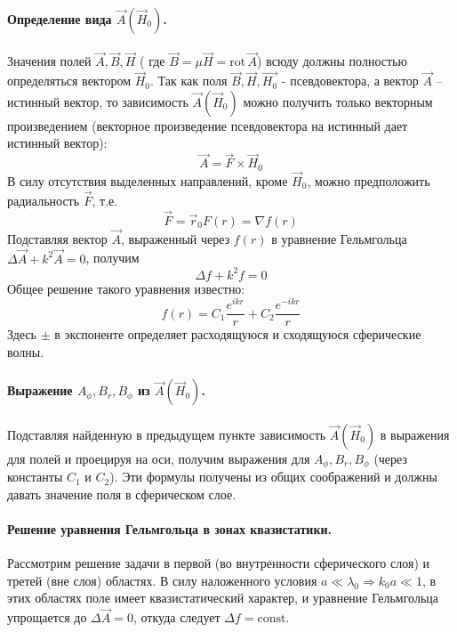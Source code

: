 \paragraph{Определение вида $\vec{A}(\vec{H}_0)$.} Значения полей $\vec{A},\vec{B},\vec{H}$ ( где $\vec{B}=\mu\vec{H}=\mathrm{rot}\,\vec{A}$) всюду должны полностью определяться вектором $\vec{H}_0$. Так как поля $\vec{B},\vec{H},\vec{H_0}$ - псевдовектора, а вектор $\vec{A}$ -- истинный вектор, то зависимость $\vec{A}(\vec{H}_0)$ можно получить только векторным произведением (векторное произведение псевдовектора на истинный дает истинный вектор):
\begin{equation}
	\vec{A}=\vec{F}\times\vec{H}_0
\end{equation}
В силу отсутствия выделенных направлений, кроме $\vec{H}_0$, можно предположить радиальность $\vec{F}$, т.е. 
\begin{equation}
	\vec{F}=\vec{r}_0 F(r)=\nabla f(r)
\end{equation}
Подставляя вектор $\vec{A}$, выраженный через $f(r)$ в уравнение Гельмгольца $\Delta\vec{A}+k^2\vec{A}=0$, получим
\begin{equation}
	\Delta f +k^2f=0
\end{equation}
Общее решение такого уравнения известно:
\begin{equation}
	f(r)=C_1\frac{e^{ikr}}{r}+C_2\frac{e^{-ikr}}{r}
\end{equation}
Здесь $\pm$ в экспоненте определяет расходящуюся и сходящуюся сферические волны.

\paragraph{Выражение $A_\phi,B_r,B_\phi$ из $\vec{A}(\vec{H}_0)$.} Подставляя найденную в предыдущем пункте зависимость $\vec{A}(\vec{H}_0)$ в выражения для полей и проецируя на оси, получим выражения для $A_\phi,B_r,B_\phi$ (через константы $C_1$ и $C_2$). Эти формулы получены из общих соображений и должны давать значение поля в сферическом слое.

\paragraph{Решение уравнения Гельмгольца в зонах квазистатики.} Рассмотрим решение задачи в первой (во внутренности сферического слоя) и третей (вне слоя) областях. В силу наложенного условия $a\ll\lambda_0\Rightarrow k_0a\ll 1$, в этих областях поле имеет квазистатический характер, и уравнение Гельмгольца упрощается до $\Delta\vec{A}=0$, откуда следует $\Delta f =\mathrm{const}$. 

